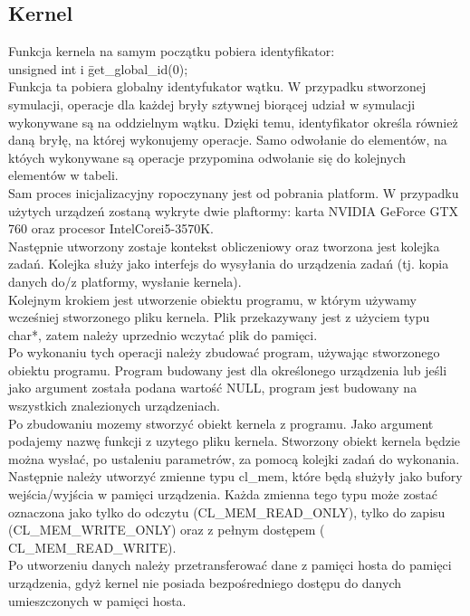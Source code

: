\subsection{Kernel}
Funkcja kernela na samym początku pobiera identyfikator: \\
unsigned int i \= get\_global\_id(0); \\
Funkcja ta pobiera globalny identyfukator wątku. W przypadku stworzonej symulacji, operacje dla każdej bryły sztywnej biorącej udział w symulacji wykonywane są na oddzielnym wątku. Dzięki temu, identyfikator określa również daną bryłę, na której wykonujemy operacje. Samo odwołanie do elementów, na któych wykonywane są operacje przypomina odwołanie się do kolejnych elementów w tabeli. \\
Sam proces inicjalizacyjny ropoczynany jest od pobrania platform. W przypadku użytych urządzeń zostaną wykryte dwie plaftormy: karta NVIDIA GeForce GTX 760 oraz procesor Intel\textregistered Core\texttrademark i5-3570K. \\ Następnie utworzony zostaje kontekst obliczeniowy oraz tworzona jest kolejka zadań. Kolejka służy jako interfejs do wysyłania do urządzenia zadań (tj. kopia danych do/z platformy, wysłanie kernela). \\
Kolejnym krokiem jest utworzenie obiektu programu, w którym używamy wcześniej stworzonego pliku kernela. Plik przekazywany jest z użyciem typu char*, zatem należy uprzednio wczytać plik do pamięci. \\
Po wykonaniu tych operacji należy zbudować program, używając stworzonego obiektu programu. Program budowany jest dla określonego urządzenia lub jeśli jako argument została podana wartość NULL, program jest budowany na wszystkich znalezionych urządzeniach. \\
Po zbudowaniu mozemy stworzyć obiekt kernela z programu. Jako argument podajemy nazwę funkcji z uzytego pliku kernela. Stworzony obiekt kernela będzie można wysłać, po ustaleniu parametrów, za pomocą kolejki zadań do wykonania. \\
Następnie należy utworzyć zmienne typu cl\_mem, które będą służyły jako bufory wejścia/wyjścia w pamięci urządzenia. Każda zmienna tego typu może zostać oznaczona jako tylko do odczytu (CL\_MEM\_READ\_ONLY), tylko do zapisu (CL\_MEM\_WRITE\_ONLY) oraz z pełnym dostępem ( CL\_MEM\_READ\_WRITE). \\
Po utworzeniu danych należy przetransferować dane z pamięci hosta do pamięci urządzenia, gdyż kernel nie posiada bezpośredniego dostępu do danych umieszczonych w pamięci hosta. \\
